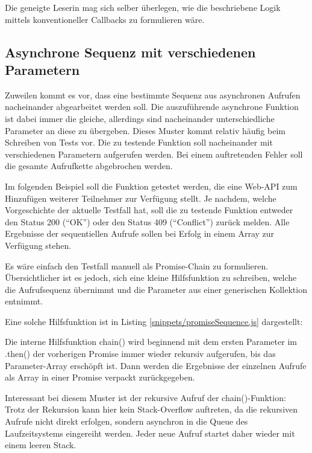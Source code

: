 \documentclass[
11pt, %
a4paper, %
oneside, %
pdfspacing, %
headinclude,
BCOR5mm, %
ngerman, %
bibtotocnumbered,
]{scrartcl}
\begin{document}
		Die geneigte Leserin mag sich selber überlegen, wie die beschriebene Logik mittels konventioneller Callbacks zu formulieren wäre.
	

	\subsection{Asynchrone Sequenz mit verschiedenen Parametern}
		
	Zuweilen kommt es vor, dass eine bestimmte Sequenz aus asynchronen Aufrufen nacheinander abgearbeitet werden soll. Die auszuführende asynchrone Funktion ist dabei immer die gleiche, allerdings sind nacheinander unterschiedliche Parameter an diese zu übergeben. Dieses Muster kommt relativ häufig beim Schreiben von Tests vor. Die zu testende Funktion soll nacheinander mit verschiedenen Parametern aufgerufen werden. Bei einem auftretenden Fehler soll die gesamte Aufrufkette abgebrochen werden.
	
	Im folgenden Beispiel soll die Funktion getestet werden, die eine Web-API zum Hinzufügen weiterer Teilnehmer zur Verfügung stellt. Je nachdem, welche Vorgeschichte der aktuelle Testfall hat, soll die zu testende Funktion entweder den Status 200 ("`OK"') oder den Status 409 ("`Conflict"') zurück melden. Alle Ergebnisse der sequentiellen Aufrufe sollen bei Erfolg in einem Array zur Verfügung stehen. 
	
	Es wäre einfach den Testfall manuell als Promise-Chain zu formulieren. Übersichtlicher ist es jedoch, sich eine kleine Hilfsfunktion zu schreiben, welche die Aufrufsequenz übernimmt und die Parameter aus einer generischen Kollektion entnimmt.
	
	Eine solche Hilfsfunktion ist in Listing \ref{snippets/promiseSequence.js} dargestellt:
	
	
	Die interne Hilfsfunktion \textsf{chain()} wird beginnend mit dem ersten Parameter im \textsf{.then()} der vorherigen Promise immer wieder rekursiv aufgerufen, bis das Parameter-Array erschöpft ist. Dann werden die Ergebnisse der einzelnen Aufrufe als Array in einer Promise verpackt zurückgegeben. 
	
	Interessant bei diesem Muster ist der rekursive Aufruf der \textsf{chain()}-Funktion: Trotz der Rekursion kann hier kein Stack-Overflow auftreten, da die rekursiven Aufrufe nicht direkt erfolgen, sondern asynchron in die Queue des Laufzeitsystems eingereiht werden. Jeder neue Aufruf startet daher wieder mit einem leeren Stack.
	
\end{document}
